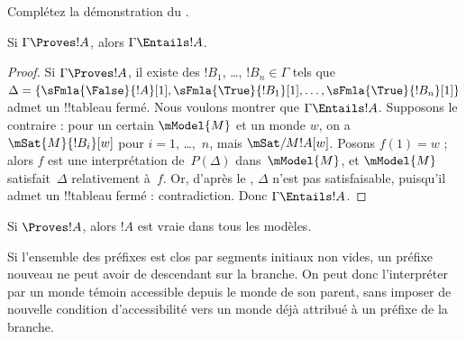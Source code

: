 \documentclass[../../../include/open-logic-section]{subfiles}
\begin{document}
\begin{prob}
Complétez la démonstration du .
\end{prob}

\begin{cor}
Si $\Gamma \Proves !A$, alors $\Gamma \Entails !A$.
\end{cor}

\begin{proof}
  Si $\Gamma \Proves !A$, il existe des $!B_1$, \dots, $!B_n \in
  \Gamma$ tels que $\Delta = \{\sFmla{\False}{!A}[1], \sFmla{\True}{!B_1}[1],
  \dots, \sFmla{\True}{!B_n}[1]\}$ admet un !!{tableau} fermé. Nous
  voulons montrer que $\Gamma \Entails !A$. Supposons le contraire :
  pour un certain $\mModel{M}$ et un monde $w$, on a
  $\mSat{M}{!B_i}[w]$ pour $i=1$, \dots,~$n$, mais
  $\mSat/{M}{!A}[w]$. Posons $f(1) = w$ ; alors $f$ est une
  interprétation de~$P(\Delta)$ dans~$\mModel{M}$, et $\mModel{M}$
  satisfait~$\Delta$ relativement à~$f$. Or, d'après le
  , $\Delta$ n'est pas satisfaisable,
  puisqu'il admet un !!{tableau} fermé : contradiction. Donc
  $\Gamma \Entails !A$.
\end{proof}

\begin{cor}
Si $\Proves !A$, alors $!A$ est vraie dans tous les modèles.
\end{cor}
\begin{explain}
Si l'ensemble des préfixes est clos par segments initiaux non
vides, un préfixe nouveau ne peut avoir de descendant sur la
branche. On peut donc l'interpréter par un monde témoin accessible
depuis le monde de son parent, sans imposer de nouvelle
condition d'accessibilité vers un monde déjà attribué à un
préfixe de la branche.
\end{explain}
\end{document}
